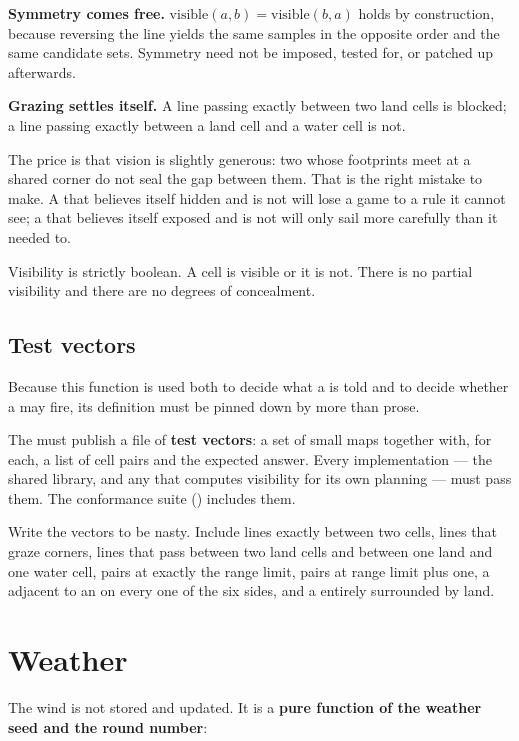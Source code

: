 \documentclass{article}
\begin{document}
\textbf{Symmetry comes free.} $\mathrm{visible}(a,b) = \mathrm{visible}(b,a)$ holds by
construction, because reversing the line yields the same samples in the opposite order and the same
candidate sets. Symmetry need not be imposed, tested for, or patched up afterwards.

\textbf{Grazing settles itself.} A line passing exactly between two land cells is blocked; a line
passing exactly between a land cell and a water cell is not.

The price is that vision is slightly generous: two \islands{} whose footprints meet at a shared
corner do not seal the
gap between them. That is the right mistake to make. A \ship{} that believes itself hidden and is
not will lose a game to a rule it cannot see; a \ship{} that believes itself exposed and is not
will only sail more carefully than it needed to.

Visibility is strictly boolean. A cell is visible or it is not. There is no partial visibility and
there are no degrees of concealment.

\subsection{Test vectors}
\label{proto:vectors}

Because this function is used both to decide what a \ship{} is told and to decide whether a \ship{}
may fire, its definition must be pinned down by more than prose.

The \WG{} must publish a file of \textbf{test vectors}: a set of small maps together with, for
each, a list of cell pairs and the expected answer. Every implementation --- the shared library,
and any \ship{} that computes visibility for its own planning --- must pass them. The conformance
suite (\OD) includes them.

Write the vectors to be nasty. Include lines exactly between two cells, lines that graze corners,
lines that pass between two land cells and between one land and one water cell, pairs at exactly
the range limit, pairs at range limit plus one, a \ship{} adjacent to an \island{} on every one of
the six sides, and a \ship{} entirely surrounded by land.

\newpage
\section{Weather}
\label{proto:weather}

The wind is not stored and updated. It is a \textbf{pure function of the weather seed and the round
number}:
\end{document}
